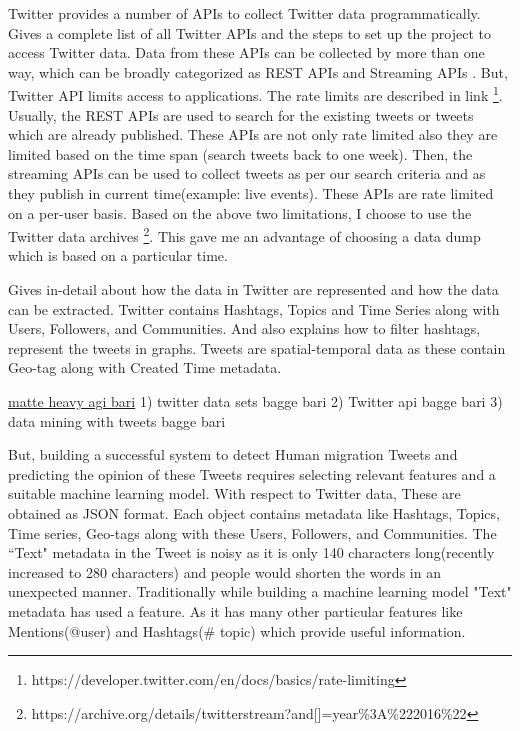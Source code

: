 Twitter provides a number of APIs to collect Twitter data programmatically. \cite{TwitterDevDocs} Gives a complete list of all Twitter APIs and the steps to set up the project to access Twitter data. Data from these APIs can be collected by more than one way, which can be broadly categorized as REST APIs and Streaming APIs . But, Twitter API limits access to applications. The rate limits are described in link  \footnote{https://developer.twitter.com/en/docs/basics/rate-limiting}. Usually, the REST APIs are used to search for the existing tweets or tweets which are already published. These APIs are not only rate limited also they are limited based on the time span (search tweets back to one week). Then, the streaming APIs can be used to collect tweets as per our search criteria and as they publish in current time(example: live events). These APIs are rate limited on a per-user basis. Based on the above two limitations, I choose to use the Twitter data archives \footnote{https://archive.org/details/twitterstream?and[]=year\%3A\%222016\%22}. This gave me an advantage of choosing a data dump which is based on a particular time.   



\cite{Marco} Gives in-detail about how the data in Twitter are represented
and how the data can be extracted. Twitter contains Hashtags, Topics and Time Series along with
Users, Followers, and Communities. And  \cite{Marco} also explains how to filter hashtags, represent the
tweets in graphs. Tweets are spatial-temporal data as these contain Geo-tag along with Created
Time metadata.

\underline{matte heavy agi bari}
1) twitter data sets bagge bari
2) Twitter api bagge bari
3) data mining with tweets bagge bari


 But, building a successful system to detect Human migration Tweets and predicting the opinion of these Tweets requires selecting relevant features and a suitable machine learning model. With respect to Twitter data, These are obtained as JSON format. Each object contains metadata like Hashtags, Topics, Time series, Geo-tags along with these Users, Followers, and Communities. The ``Text" metadata in the Tweet is noisy as it is only 140 characters long(recently increased to 280 characters) and people would shorten the words in an unexpected manner. Traditionally while building a machine learning model "Text" metadata has used a feature. As it has many other particular features like Mentions(@user) and Hashtags(\# topic) which provide useful information.
 
